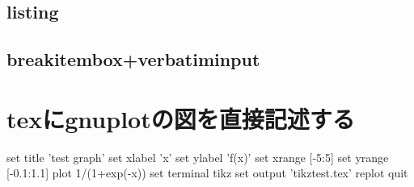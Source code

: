\documentclass[a4j,titlepage]{ltjsarticle}   %
\begin{document}
\subsection{listing}


\subsection{breakitembox+verbatiminput}
%   

\section{texにgnuplotの図を直接記述する}
\begin{shellcode}
  set title 'test graph'
  set xlabel 'x'
  set ylabel 'f(x)'
  set xrange [-5:5]
  set yrange [-0.1:1.1]
  plot 1/(1+exp(-x))
  set terminal tikz
  set output 'tikztest.tex'
  replot
  quit
\end{shellcode}
\centering

\end{document}
